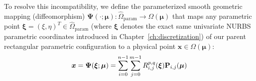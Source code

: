 To resolve this incompatibility, we define the parameterized smooth geometric mapping (diffeomorphism) $\boldsymbol{\Psi}(\cdot; \boldsymbol{\mu}): \hat{\Omega}_{\text{param}} \to \Omega(\boldsymbol{\mu})$ that maps any parametric point $\boldsymbol{\xi} = (\xi, \eta)^T \in \hat{\Omega}_{\text{param}}$ (where $\boldsymbol{\xi}$ denotes the exact same univariate NURBS parametric coordinates introduced in Chapter~\ref{ch:discretization}) of our parent rectangular parametric configuration to a physical point $\boldsymbol{x} \in \Omega(\boldsymbol{\mu})$:
\begin{equation}
    \boldsymbol{x} = \boldsymbol{\Psi}(\boldsymbol{\xi}; \boldsymbol{\mu}) = \sum_{i=0}^{n-1} \sum_{j=0}^{m-1} R_{i,j}^{p,q}(\boldsymbol{\xi}) \mathbf{P}_{i,j}(\boldsymbol{\mu})
\end{equation}

